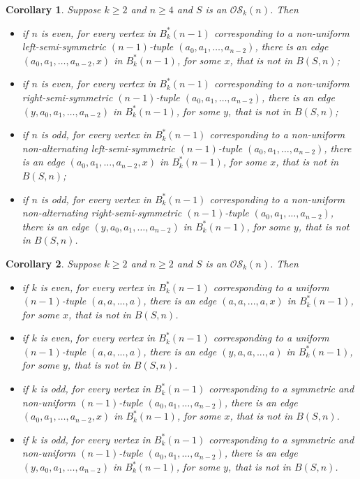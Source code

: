 \documentclass[10pt,a4paper]{amsart}
\newtheorem{corollary}{Corollary}
\begin{document}
\begin{corollary}  \label{corollary:excluded_tuples_by_unequal_degree}
Suppose $k\geq2$ and $n\geq4$ and $S$ is an $\mathcal{OS}_k(n)$. Then
\begin{itemize}
\item[i)] if $n$ is even, for every vertex in $B^*_k(n-1)$ corresponding to a non-uniform
    left-semi-symmetric $(n-1)$-tuple $(a_0,a_1,\ldots,a_{n-2})$, there is an edge
    $(a_0,a_1,\ldots,a_{n-2},x)$ in $B^*_k(n-1)$, for some $x$, that is not in $B(S,n)$;
\item[ii)] if $n$ is even, for every vertex in $B^*_k(n-1)$ corresponding to a non-uniform
    right-semi-symmetric $(n-1)$-tuple $(a_0,a_1,\ldots,a_{n-2})$, there is an edge
    $(y,a_0,a_1,\ldots,a_{n-2})$ in $B^*_k(n-1)$, for some $y$, that is not in $B(S,n)$;
\item[iii)] if $n$ is odd, for every vertex in $B^*_k(n-1)$ corresponding to a non-uniform
    non-alternating left-semi-symmetric $(n-1)$-tuple $(a_0,a_1,\ldots,a_{n-2})$, there is an
    edge $(a_0,a_1,\ldots,a_{n-2},x)$ in $B^*_k(n-1)$, for some $x$, that is not in $B(S,n)$;
\item[iv)] if $n$ is odd, for every vertex in $B^*_k(n-1)$ corresponding to a non-uniform
    non-alternating right-semi-symmetric $(n-1)$-tuple $(a_0,a_1,\ldots,a_{n-2})$, there is an
    edge $(y,a_0,a_1,\ldots,a_{n-2})$ in $B^*_k(n-1)$, for some $y$, that is not in $B(S,n)$.
\end{itemize}
\end{corollary}

\begin{corollary}  \label{corollary:excluded-tuples-by-parity}
Suppose $k\geq2$ and $n\geq2$ and $S$ is an $\mathcal{OS}_k(n)$. Then
\begin{itemize}
\item[i)] if $k$ is even, for every vertex in $B^*_k(n-1)$ corresponding to a uniform
    $(n-1)$-tuple $(a,a,...,a)$, there is an edge $(a,a,...,a,x)$ in $B^*_k(n-1)$, for some
    $x$, that is not in $B(S,n)$.
\item[ii)] if $k$ is even, for every vertex in $B^*_k(n-1)$ corresponding to a uniform
    $(n-1)$-tuple $(a,a,...,a)$, there is an edge $(y,a,a,...,a)$ in $B^*_k(n-1)$, for some
    $y$, that is not in $B(S,n)$.
\item[iii)] if $k$ is odd, for every vertex in $B^*_k(n-1)$ corresponding to a symmetric and
    non-uniform $(n-1)$-tuple $(a_0,a_1,\ldots,a_{n-2})$, there is an edge
    $(a_0,a_1,\ldots,a_{n-2},x)$ in $B^*_k(n-1)$, for some $x$, that is not in $B(S,n)$.
\item[iv)] if $k$ is odd, for every vertex in $B^*_k(n-1)$ corresponding to a symmetric and
    non-uniform $(n-1)$-tuple $(a_0,a_1,\ldots,a_{n-2})$, there is an edge
    $(y,a_0,a_1,\ldots,a_{n-2})$ in $B^*_k(n-1)$, for some $y$, that is not in $B(S,n)$.
\end{itemize}
\end{corollary}
\end{document}
